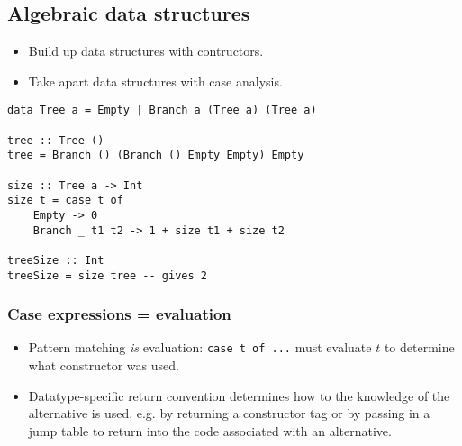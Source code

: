 \documentclass{beamer}
\begin{document}
\subsection{Algebraic data structures}


\begin{frame}[fragile]
    \begin{itemize}
        \item Build up data structures with \alert{contructors}.
        \item Take apart data structures with \alert{case analysis}.
    \end{itemize}

    \begin{lstlisting}
data Tree a = Empty | Branch a (Tree a) (Tree a)

tree :: Tree ()
tree = Branch () (Branch () Empty Empty) Empty

size :: Tree a -> Int
size t = case t of
    Empty -> 0
    Branch _ t1 t2 -> 1 + size t1 + size t2

treeSize :: Int
treeSize = size tree -- gives 2
    \end{lstlisting}
\end{frame}

\begin{frame}
    \frametitle{Case expressions = evaluation}

    \begin{itemize}
        \item Pattern matching \emph{is} evaluation:
            \texttt{case t of ...} must evaluate $t$ to determine what
            constructor was used.
        \item Datatype-specific \alert{return convention} determines how to
            the knowledge of the alternative is used, e.g. by returning a
            constructor tag or by passing in a jump table to return into the
            code associated with an alternative.
    \end{itemize}
\end{frame}
\end{document}

